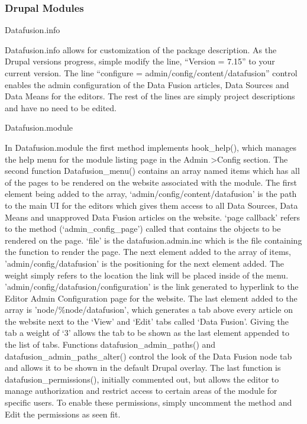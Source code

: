 \documentclass[11pt]{article} %
\begin{document}
\subsubsection{Drupal Modules}

Datafusion.info

Datafusion.info allows for customization of the package description. As the Drupal versions progress, simple modify the line, “Version = 7.15” to your current version. The line “configure = admin/config/content/datafusion” control enables the admin configuration of the Data Fusion articles, Data Sources and Data Means for the editors.  The rest of the lines are simply project descriptions and have no need to be edited.

Datafusion.module

In Datafusion.module the first method implements hook\_help(), which manages the help menu for the module listing page in the Admin \textgreater Config section. The second function Datafusion\_menu() contains an array named items which has all of the pages to be rendered on the website associated with the module. The first element being added to the array, ‘admin/config/content/datafusion’ is the path to the main UI for the editors which gives them access to all Data Sources, Data Means and unapproved Data Fusion articles on the website. ‘page callback’ refers to the method (‘admin\_config\_page’) called that contains the objects to be rendered on the page. ‘file’ is the datafusion.admin.inc which is the file containing the function to render the page. The next element added to the array of items, 'admin/config/datafusion' is the positioning for the next element added. The weight simply refers to the location the link will be placed inside of the menu. 'admin/config/datafusion/configuration' is the link generated to hyperlink to the Editor Admin Configuration page for the website. The last element added to the array is 'node/\%node/datafusion', which generates a tab above every article on the website next to the ‘View’ and ‘Edit’ tabs called ‘Data Fusion’. Giving the tab a weight of ‘3’ allows the tab to be shown as the last element appended to the list of tabs. Functions datafusion\_admin\_paths() and datafusion\_admin\_paths\_alter() control the look of the Data Fusion node tab and allows it to be shown in the default Drupal overlay. The last function is datafusion\_permissions(), initially commented out, but allows the editor to manage authorization and restrict access to certain areas of the module for specific users. To enable these permissions, simply uncomment the method and Edit the permissions as seen fit.
\end{document}
